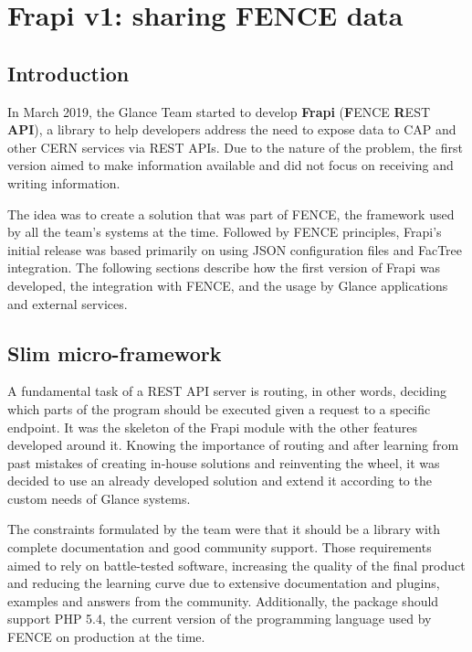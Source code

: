 \chapter{Frapi v1: sharing FENCE data}
\label{chap3}

\section{Introduction}

In March 2019, the Glance Team started to develop \textbf{Frapi} (\textbf{F}ENCE \textbf{R}EST \textbf{API}), a library to help developers address the need to expose data to CAP and other CERN services via REST APIs. Due to the nature of the problem, the first version aimed to make information available and did not focus on receiving and writing information.

The idea was to create a solution that was part of FENCE, the framework used by all the team's systems at the time. Followed by FENCE principles, Frapi's initial release was based primarily on using JSON configuration files and FacTree integration. The following sections describe how the first version of Frapi was developed, the integration with FENCE, and the usage by Glance applications and external services.

\section{Slim micro-framework}

A fundamental task of a REST API server is routing, in other words, deciding which parts of the program should be executed given a request to a specific endpoint. It was the skeleton of the Frapi module with the other features developed around it. Knowing the importance of routing and after learning from past mistakes of creating in-house solutions and reinventing the wheel, it was decided to use an already developed solution and extend it according to the custom needs of Glance systems.

The constraints formulated by the team were that it should be a library with complete documentation and good community support. Those requirements aimed to rely on battle-tested software, increasing the quality of the final product and reducing the learning curve due to extensive documentation and plugins, examples and answers from the community. Additionally, the package should support PHP 5.4, the current version of the programming language used by FENCE on production at the time.

